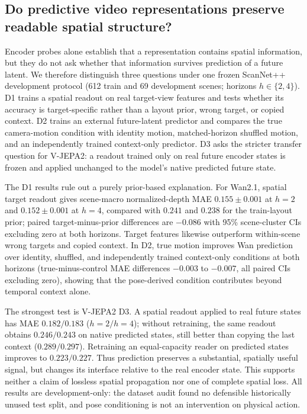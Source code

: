 \subsection{Do predictive video representations preserve readable spatial structure?}

Encoder probes alone establish that a representation contains spatial information, but they do not ask whether that information survives prediction of a future latent.  We therefore distinguish three questions under one frozen ScanNet++ development protocol (612 train and 69 development scenes; horizons $h\in\{2,4\}$).  D1 trains a spatial readout on real target-view features and tests whether its accuracy is target-specific rather than a layout prior, wrong target, or copied context.  D2 trains an external future-latent predictor and compares the true camera-motion condition with identity motion, matched-horizon shuffled motion, and an independently trained context-only predictor.  D3 asks the stricter transfer question for V-JEPA2: a readout trained only on real future encoder states is frozen and applied unchanged to the model's native predicted future state.

The D1 results rule out a purely prior-based explanation.  For Wan2.1, spatial target readout gives scene-macro normalized-depth MAE $0.155\pm0.001$ at $h{=}2$ and $0.152\pm0.001$ at $h{=}4$, compared with $0.241$ and $0.238$ for the train-layout prior; paired target-minus-prior differences are $-0.086$ with 95\% scene-cluster CIs excluding zero at both horizons.  Target features likewise outperform within-scene wrong targets and copied context.  In D2, true motion improves Wan prediction over identity, shuffled, and independently trained context-only conditions at both horizons (true-minus-control MAE differences $-0.003$ to $-0.007$, all paired CIs excluding zero), showing that the pose-derived condition contributes beyond temporal context alone.

The strongest test is V-JEPA2 D3.  A spatial readout applied to real future states has MAE $0.182/0.183$ ($h{=}2/h{=}4$); without retraining, the same readout obtains $0.246/0.243$ on native predicted states, still better than copying the last context ($0.289/0.297$).  Retraining an equal-capacity reader on predicted states improves to $0.223/0.227$.  Thus prediction preserves a substantial, spatially useful signal, but changes its interface relative to the real encoder state.  This supports neither a claim of lossless spatial propagation nor one of complete spatial loss.  All results are development-only: the dataset audit found no defensible historically unused test split, and pose conditioning is not an intervention on physical action.
